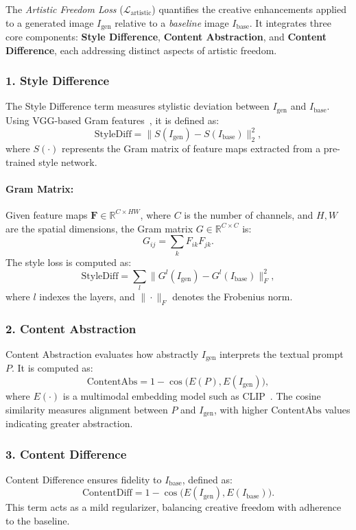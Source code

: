 The \emph{Artistic Freedom Loss} (\(\mathcal{L}_{\text{artistic}}\)) quantifies the creative enhancements applied to a generated image \(I_{\text{gen}}\) relative to a \emph{baseline} image \(I_{\text{base}}\). It integrates three core components: \textbf{Style Difference}, \textbf{Content Abstraction}, and \textbf{Content Difference}, each addressing distinct aspects of artistic freedom.

\subsubsection{1. Style Difference}
The Style Difference term measures stylistic deviation between \(I_{\text{gen}}\) and \(I_{\text{base}}\). Using VGG-based Gram features~\cite{gatys2016neural, johnson2016perceptual}, it is defined as:
\[
\text{StyleDiff} = \| S(I_{\text{gen}}) - S(I_{\text{base}}) \|_2^2,
\]
where \(S(\cdot)\) represents the Gram matrix of feature maps extracted from a pre-trained style network.

\paragraph{Gram Matrix:} Given feature maps \(\mathbf{F} \in \mathbb{R}^{C \times HW}\), where \(C\) is the number of channels, and \(H, W\) are the spatial dimensions, the Gram matrix \(G \in \mathbb{R}^{C \times C}\) is:
\[
G_{ij} = \sum_{k} F_{ik} F_{jk}.
\]
The style loss is computed as:
\[
\text{StyleDiff} = \sum_{l} \| G^l(I_{\text{gen}}) - G^l(I_{\text{base}}) \|_F^2,
\]
where \(l\) indexes the layers, and \(\|\cdot\|_F\) denotes the Frobenius norm.

\subsubsection{2. Content Abstraction}
Content Abstraction evaluates how abstractly \(I_{\text{gen}}\) interprets the textual prompt \(P\). It is computed as:
\[
\text{ContentAbs} = 1 - \cos\bigl(E(P), E(I_{\text{gen}})\bigr),
\]
where \(E(\cdot)\) is a multimodal embedding model such as CLIP~\cite{radford2021learning}. The cosine similarity measures alignment between \(P\) and \(I_{\text{gen}}\), with higher \(\text{ContentAbs}\) values indicating greater abstraction.

\subsubsection{3. Content Difference}
Content Difference ensures fidelity to \(I_{\text{base}}\), defined as:
\[
\text{ContentDiff} = 1 - \cos\bigl(E(I_{\text{gen}}), E(I_{\text{base}})\bigr).
\]
This term acts as a mild regularizer, balancing creative freedom with adherence to the baseline.

